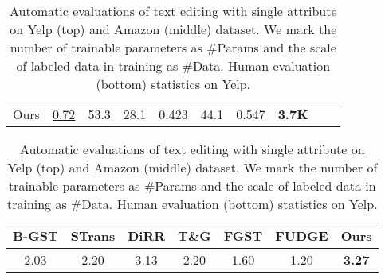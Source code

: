 \documentclass[11pt]{article}
\begin{document}
\begin{table}[ht]
\begin{tabular}{@{}lccccccccc@{}}
        \\
        Ours& \underline{0.72} & 53.3 & 28.1& {0.423}& 44.1&0.547  &\textbf{3.7K}&
        \\\cmidrule[\heavyrulewidth]{1-9}
    \end{tabular}
    \begin{tabular}{ccccccc}
     \cmidrule[\heavyrulewidth]{1-7}
     B-GST & STrans & DiRR & T\&G & FGST & FUDGE & Ours  \\\midrule
     2.03 & 2.20 & 3.13 & 2.20 & 1.60 & 1.20 & \textbf{3.27}\\\bottomrule
    \end{tabular}
    \caption{Automatic evaluations of text editing with single attribute on Yelp (top) and Amazon (middle) dataset.
    We mark the number of trainable parameters as \#Params and the scale of labeled data in training as \#Data.  Human evaluation (bottom) statistics on Yelp.}
    \label{tab:tst_single}
\end{table}
\end{document}
